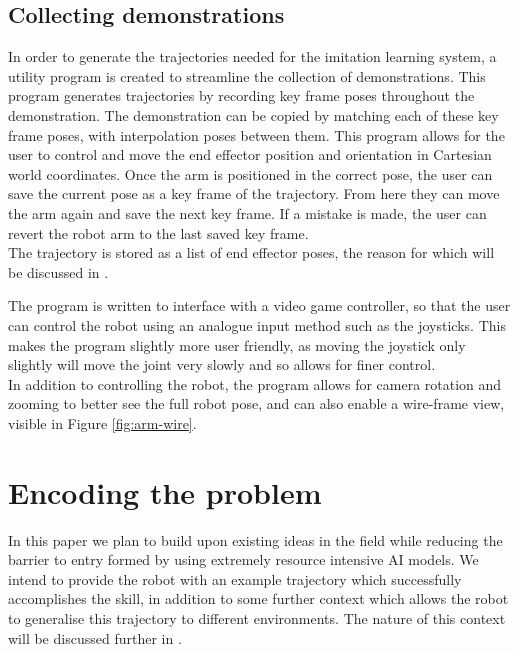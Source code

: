 \subsection{Collecting demonstrations}
In order to generate the trajectories needed for the imitation learning system, a utility program is created to streamline the collection of demonstrations. This program generates trajectories by recording key frame poses throughout the demonstration. The demonstration can be copied by matching each of these key frame poses, with interpolation poses between them.
This program allows for the user to control and move the end effector position and orientation in Cartesian world coordinates. Once the arm is positioned in the correct pose, the user can save the current pose as a key frame of the trajectory. From here they can move the arm again and save the next key frame. If a mistake is made, the user can revert the robot arm to the last saved key frame.\\
The trajectory is stored as a list of end effector poses, the reason for which will be discussed in .

The program is written to interface with a video game controller, so that the user can control the robot using an analogue input method such as the joysticks. This makes the program slightly more user friendly, as moving the joystick only slightly will move the joint very slowly and so allows for finer control.\\
In addition to controlling the robot, the program allows for camera rotation and zooming to better see the full robot pose, and can also enable a wire-frame view, visible in Figure \ref{fig:arm-wire}.


\section{Encoding the problem}
\label{sec:trajectories}
In this paper we plan to build upon existing ideas in the field while reducing the barrier to entry formed by using extremely resource intensive AI models. We intend to provide the robot with an example trajectory which successfully accomplishes the skill, in addition to some further context which allows the robot to generalise this trajectory to different environments. The nature of this context will be discussed further in .\\

